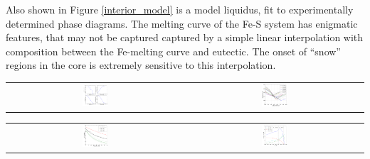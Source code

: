 \documentclass[landscape,a0b,final]{a0poster}
\begin{document}
\begin{multicols}{3}
Also shown in Figure \ref{interior_model} is a model liquidus, fit to
experimentally determined phase diagrams. The melting curve of the Fe-S system has
enigmatic features, that may not be captured captured by a simple linear
interpolation with composition between the Fe-melting curve and eutectic. The onset
of ``snow'' regions in the core is extremely sensitive to this interpolation.

\begin{center}
\begin{tabular}{cc}
 \includegraphics[width=0.15\textwidth]{profiles.png} &
 \includegraphics[width=0.15\textwidth]{Liquidus_model.png} \\
\end{tabular}
\label{interior_model}
\end{center}

\begin{center}
\begin{tabular}{cc}
 \includegraphics[width=0.15\textwidth]{clapeyron_1.png} &
 \includegraphics[width=0.15\textwidth]{core_energetics.png} \\
\end{tabular}
\label{core_energy}
\end{center}



\end{multicols}
\end{document}
